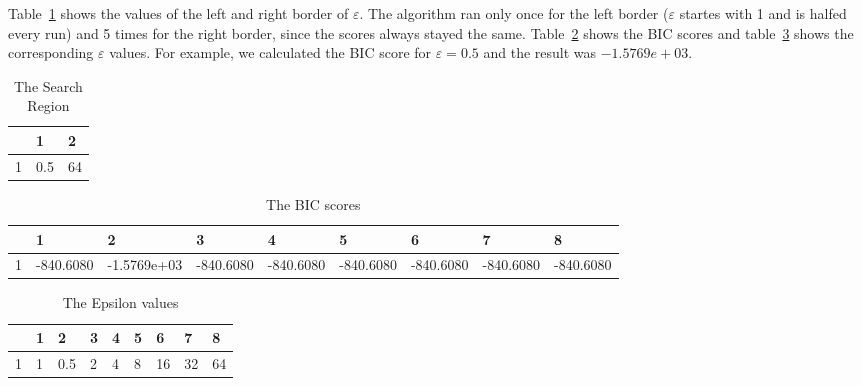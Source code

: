 \documentclass[
a4paper,
12pt
]{scrartcl}
\newcommand{\gray}{\cellcolor{grayself}}  %
\begin{document}
Table~\ref{table:region} shows the values of the left and right border of $\varepsilon$. The algorithm ran only once for the left border ($\varepsilon$ startes with 1 and is halfed every run) and 5 times for the right border, since the scores always stayed the same. Table~\ref{table:bicscores} shows the BIC scores and table~\ref{table:epsilonvalues} shows the corresponding $\varepsilon$ values. For example, we calculated the BIC score for $\varepsilon = 0.5$ and the result was $-1.5769e+03$.

\begin{table}[ht!]
\centering
\begin{tabular}{|l|l|l|}
\hline
\gray &\gray 1 & \gray 2 \\ \hline
\gray 1&0.5 & 64 \\ \hline
\end{tabular}
\caption{The Search Region}
\label{table:region}
\end{table}

\begin{table}[ht!]
\centering
\begin{tabular}{|l|l|l|l|l|l|l|l|l|}
\hline
\gray &\gray 1 & \gray 2 & \gray 3 & \gray 4 & \gray 5 & \gray 6 & \gray 7 & \gray 8 \\ \hline
\gray 1&-840.6080 & -1.5769e+03 & -840.6080 & -840.6080 & -840.6080 & -840.6080 & -840.6080 & -840.6080 \\ \hline
\end{tabular}
\caption{The BIC scores}
\label{table:bicscores}
\end{table}

\begin{table}[ht!]
\centering
\begin{tabular}{|l|l|l|l|l|l|l|l|l|}
\hline
\gray &\gray 1 & \gray 2 & \gray 3 & \gray 4 & \gray 5 & \gray 6 & \gray 7 & \gray 8 \\ \hline
\gray 1&1 & 0.5 & 2 & 4 & 8 & 16 & 32 & 64 \\ \hline
\end{tabular}
\caption{The Epsilon values}
\label{table:epsilonvalues}
\end{table}
\end{document}
